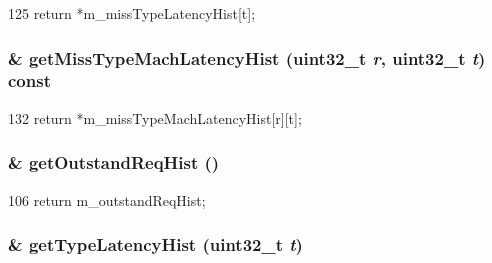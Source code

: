 \begin{DoxyCode}
125     { return *m_missTypeLatencyHist[t]; }
\end{DoxyCode}
\hypertarget{classSequencer_a72d6c50e8af0a27e656f731aa0196daa}{
\subsubsection[{getMissTypeMachLatencyHist}]{\& getMissTypeMachLatencyHist ({\bf uint32\_\-t} {\em r}, \/  {\bf uint32\_\-t} {\em t}) const}}
\label{classSequencer_a72d6c50e8af0a27e656f731aa0196daa}



\begin{DoxyCode}
132     { return *m_missTypeMachLatencyHist[r][t]; }
\end{DoxyCode}
\hypertarget{classSequencer_aad0db21fdf9ff4bdf60a45e0eea9ef12}{
\subsubsection[{getOutstandReqHist}]{\& getOutstandReqHist ()}}
\label{classSequencer_aad0db21fdf9ff4bdf60a45e0eea9ef12}



\begin{DoxyCode}
106 { return m_outstandReqHist; }
\end{DoxyCode}
\hypertarget{classSequencer_ad93cd72a0644b8593762e57de8dcaef3}{
\subsubsection[{getTypeLatencyHist}]{\& getTypeLatencyHist ({\bf uint32\_\-t} {\em t})}}
\label{classSequencer_ad93cd72a0644b8593762e57de8dcaef3}



